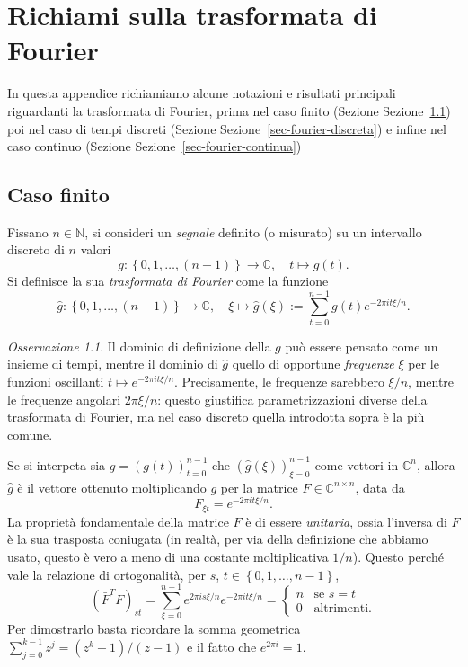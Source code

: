 \documentclass[
  italian,
  letterpaper,
]{book}
\newcommand{\cur}[1]{\left\{ #1 \right\}}
\newcommand{\N}{\mathbb{N}}
\theoremstyle{definition}
\theoremstyle{remark}
\newtheorem*{remark}{Osservazione}
\begin{document}
\chapter{Richiami sulla trasformata di Fourier}\label{sec-fourier}

In questa appendice richiamiamo alcune notazioni e risultati principali
riguardanti la trasformata di Fourier, prima nel caso finito (Sezione
Sezione~\ref{sec-fourier-finita}) poi nel caso di tempi discreti
(Sezione Sezione~\ref{sec-fourier-discreta}) e infine nel caso continuo
(Sezione Sezione~\ref{sec-fourier-continua})

\section{Caso finito}\label{sec-fourier-finita}

Fissano \(n \in \N\), si consideri un \emph{segnale} definito (o
misurato) su un intervallo discreto di \(n\) valori
\[g : \cur{0, 1, \ldots, (n-1)} \to \mathbb{C}, \quad t \mapsto g( t ).\]
Si definisce la sua \emph{trasformata di Fourier} come la funzione
\[ \hat g : \cur{0, 1, \ldots, (n-1)}  \to \mathbb{C}, \quad \xi \mapsto  \hat{g}(\xi) := \sum_{t=0}^{n-1} g(t) e^{ - 2 \pi i t \xi/n}.\]

\begin{remark}
Il dominio di definizione della \(g\) può essere pensato come un insieme
di tempi, mentre il dominio di \(\hat{g}\) quello di opportune
\emph{frequenze} \(\xi\) per le funzioni oscillanti
\(t \mapsto e^{ - 2 \pi i t \xi/n}\). Precisamente, le frequenze
sarebbero \(\xi/n\), mentre le frequenze angolari \(2 \pi \xi/n\):
questo giustifica parametrizzazioni diverse della trasformata di
Fourier, ma nel caso discreto quella introdotta sopra è la più comune.
\end{remark}

Se si interpeta sia \(g = (g(t))_{t=0}^{n-1}\) che
\((\hat g(\xi))_{\xi =0}^{n-1}\) come vettori in \(\mathbb{C}^n\),
allora \(\hat{g}\) è il vettore ottenuto moltiplicando \(g\) per la
matrice \(F \in \mathbb{C}^{n\times n}\), data da
\[ F_{\xi t } = e^{ - 2 \pi i t \xi/n}.\] La proprietà fondamentale
della matrice \(F\) è di essere \emph{unitaria}, ossia l'inversa di
\(F\) è la sua trasposta coniugata (in realtà, per via della definizione
che abbiamo usato, questo è vero a meno di una costante moltiplicativa
\(1/n\)). Questo perché vale la relazione di ortogonalità, per \(s\),
\(t \in \cur{0,1, \ldots, n-1}\),
\[  (\bar{F}^T F)_{s t} = \sum_{\xi = 0}^{n-1} e^{  2 \pi i s \xi/n}e^{ - 2 \pi i t \xi/n} = \begin{cases}  n & \text{se $s=t$}\\
 0 &\text{altrimenti.}
 \end{cases}\] Per dimostrarlo basta ricordare la somma geometrica
\(\sum_{j=0}^{k-1} z^j = (z^{k}-1)/(z-1)\) e il fatto che
\(e^{2\pi i }= 1\).
\end{document}
